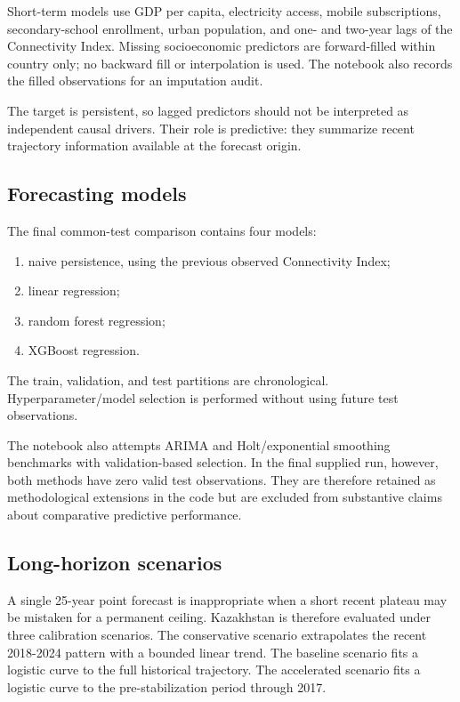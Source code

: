 \documentclass[conference]{IEEEtran}
\begin{document}
Short-term models use GDP per capita, electricity access, mobile subscriptions, secondary-school enrollment, urban population, and one- and two-year lags of the Connectivity Index. Missing socioeconomic predictors are forward-filled within country only; no backward fill or interpolation is used. The notebook also records the filled observations for an imputation audit.

The target is persistent, so lagged predictors should not be interpreted as independent causal drivers. Their role is predictive: they summarize recent trajectory information available at the forecast origin.

\subsection{Forecasting models}

The final common-test comparison contains four models:
\begin{enumerate}
\item naive persistence, using the previous observed Connectivity Index;
\item linear regression;
\item random forest regression;
\item XGBoost regression.
\end{enumerate}

The train, validation, and test partitions are chronological. Hyperparameter/model selection is performed without using future test observations.

The notebook also attempts ARIMA and Holt/exponential smoothing benchmarks with validation-based selection. In the final supplied run, however, both methods have zero valid test observations. They are therefore retained as methodological extensions in the code but are excluded from substantive claims about comparative predictive performance.

\subsection{Long-horizon scenarios}

A single 25-year point forecast is inappropriate when a short recent plateau may be mistaken for a permanent ceiling. Kazakhstan is therefore evaluated under three calibration scenarios. The conservative scenario extrapolates the recent 2018-2024 pattern with a bounded linear trend. The baseline scenario fits a logistic curve to the full historical trajectory. The accelerated scenario fits a logistic curve to the pre-stabilization period through 2017.
\end{document}
